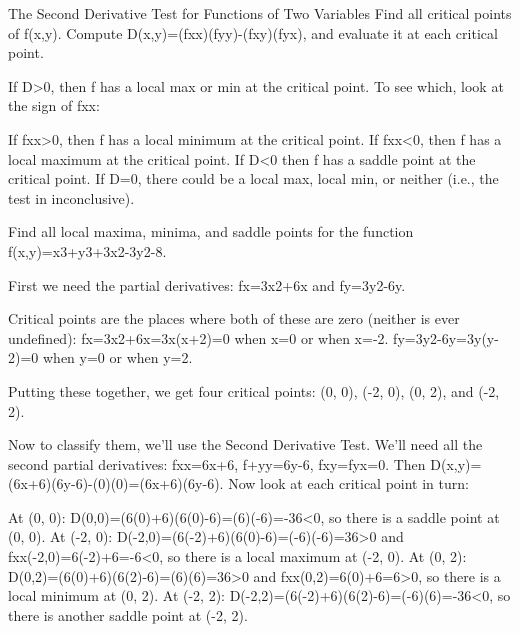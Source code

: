 The Second Derivative Test for Functions of Two Variables
Find all critical points of f(x,y).
Compute
D(x,y)=(fxx)(fyy)-(fxy)(fyx),
and evaluate it at each critical point.

If D>0, then f has a local max or min at the critical point. To see which, look at the sign of fxx:

If fxx>0, then f has a local minimum at the critical point.
If fxx<0, then f has a local maximum at the critical point.
If D<0 then f has a saddle point at the critical point.
If D=0, there could be a local max, local min, or neither (i.e., the test in inconclusive).
\begin{example}
Find all local maxima, minima, and saddle points for the function
f(x,y)=x3+y3+3x2-3y2-8.

\begin{solution}
  First we need the partial derivatives: fx=3x2+6x and fy=3y2-6y.

Critical points are the places where both of these are zero (neither is ever undefined): fx=3x2+6x=3x(x+2)=0 when x=0 or when x=-2. fy=3y2-6y=3y(y-2)=0 when y=0 or when y=2.

Putting these together, we get four critical points: (0, 0), (-2, 0), (0, 2), and (-2, 2).

Now to classify them, we’ll use the Second Derivative Test. We’ll need all the second partial derivatives:
fxx=6x+6, f+yy=6y-6, fxy=fyx=0.
Then
D(x,y)=(6x+6)(6y-6)-(0)(0)=(6x+6)(6y-6).
Now look at each critical point in turn:

At (0, 0): D(0,0)=(6(0)+6)(6(0)-6)=(6)(-6)=-36<0, so there is a saddle point at (0, 0).
At (-2, 0): D(-2,0)=(6(-2)+6)(6(0)-6)=(-6)(-6)=36>0 and fxx(-2,0)=6(-2)+6=-6<0, so there is a local maximum at (-2, 0).
At (0, 2): D(0,2)=(6(0)+6)(6(2)-6)=(6)(6)=36>0 and fxx(0,2)=6(0)+6=6>0, so there is a local minimum at (0, 2).
At (-2, 2): D(-2,2)=(6(-2)+6)(6(2)-6)=(-6)(6)=-36<0, so there is another saddle point at (-2, 2).
\end{solution}\end{example}

